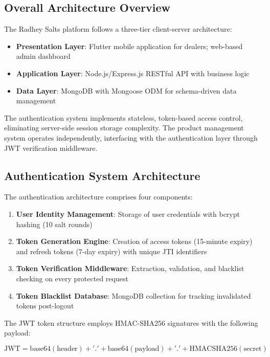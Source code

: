 \documentclass[conference]{IEEEtran}
\begin{document}
\subsection{Overall Architecture Overview}

The Radhey Salts platform follows a three-tier client-server architecture:

\begin{itemize}
\item \textbf{Presentation Layer}: Flutter mobile application for dealers; web-based admin dashboard
\item \textbf{Application Layer}: Node.js/Express.js RESTful API with business logic
\item \textbf{Data Layer}: MongoDB with Mongoose ODM for schema-driven data management
\end{itemize}

The authentication system implements stateless, token-based access control, eliminating server-side session storage complexity. The product management system operates independently, interfacing with the authentication layer through JWT verification middleware.

\subsection{Authentication System Architecture}

The authentication architecture comprises four components:

\begin{enumerate}
\item \textbf{User Identity Management}: Storage of user credentials with bcrypt hashing (10 salt rounds)
\item \textbf{Token Generation Engine}: Creation of access tokens (15-minute expiry) and refresh tokens (7-day expiry) with unique JTI identifiers
\item \textbf{Token Verification Middleware}: Extraction, validation, and blacklist checking on every protected request
\item \textbf{Token Blacklist Database}: MongoDB collection for tracking invalidated tokens post-logout
\end{enumerate}

The JWT token structure employs HMAC-SHA256 signatures with the following payload:

\begin{equation}
\text{JWT} = \text{base64}(\text{header}) + '.' + \text{base64}(\text{payload}) + '.' + \text{HMACSHA256}(\text{secret})
\end{equation}
\end{document}

